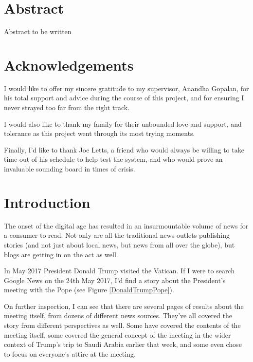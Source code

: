 \documentclass[12pt]{article}
\begin{document}

\section*{Abstract}
Abstract to be written

\pagebreak

\section*{Acknowledgements}

I would like to offer my sincere gratitude to my supervisor, Anandha Gopalan, for his total support and advice during the course of this project, and for ensuring I never strayed too far from the right track.

I would also like to thank my family for their unbounded love and support, and tolerance as this project went through its most trying moments.

Finally, I'd like to thank Joe Letts, a friend who would always be willing to take time out of his schedule to help test the system, and who would prove an invaluable sounding board in times of crisis.

\clearpage

\doublespacing
\tableofcontents
\pagebreak
\singlespacing



\section{Introduction}

\label{intro}

The onset of the digital age has resulted in an insurmountable volume of news for a consumer to read. Not only are all the traditional news outlets publishing stories (and not just about local news, but news from all over the globe), but blogs are getting in on the act as well. 

In May 2017 President Donald Trump visited the Vatican. If I were to search Google News on the 24th May 2017, I'd find a story about the President's meeting with the Pope (see Figure \ref{DonaldTrumpPope}). 

On further inspection, I can see that there are several pages of results about the meeting itself, from dozens of different news sources. They've all covered the story from different perspectives as well. Some have covered the contents of the meeting itself, some covered the general concept of the meeting in the wider context of Trump's trip to Saudi Arabia earlier that week, and some even chose to focus on everyone's attire at the meeting.
\end{document}
